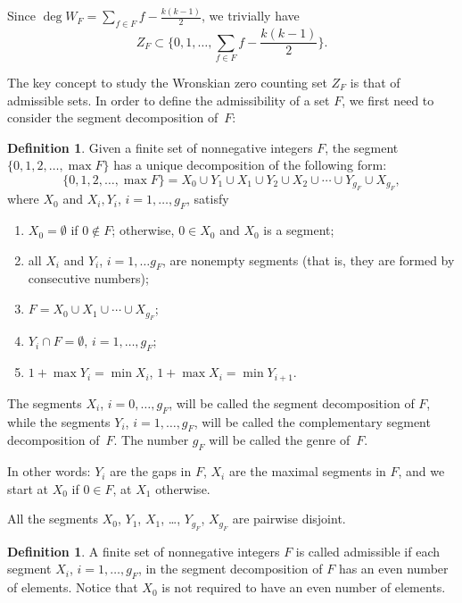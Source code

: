 \documentclass[10pt]{article}
\theoremstyle{plain}
\theoremstyle{definition}
\newtheorem{definition}[theorem]{Definition}
\numberwithin{equation}{section} %
\begin{document}
Since $\deg W_F=\sum_{f\in F}f-\frac{k(k-1)}{2}$, we trivially have
\[
  Z_F\subset \bigg\{0,1,\dots, \sum_{f\in F}f-\frac{k(k-1)}{2}\bigg\}.
\]

The key concept to study the Wronskian zero counting set $Z_F$ is that of admissible sets. In order to define the admissibility of a set $F$, we first need to consider the segment decomposition of~$F$:

\begin{definition}
Given a finite set of nonnegative integers $F$, the segment $\{0,1,\allowbreak 2,\dots,\allowbreak \max F\}$ has a unique decomposition of the following form:
\[
   \{0,1,2,\dots,\max F\}
   = X_0 \cup Y_1 \cup X_1 \cup Y_2 \cup X_2 \cup
   \dotsb \cup Y_{g_F} \cup X_{g_F},
\]
where $X_0$ and $X_i, Y_i$, $i=1,\dots, g_F$, satisfy
\begin{enumerate}
\item $X_0 = \emptyset$ if $0 \notin F$; otherwise, $0 \in X_0$ and $X_0$ is a segment;
\item all $X_i$ and $Y_i$, $i = 1, \dots g_F$, are nonempty segments (that is, they are formed by consecutive numbers);
\item $F = X_0 \cup X_1 \cup \dotsb \cup X_{g_F}$;
\item $Y_i\cap F=\emptyset$, $i=1,\dots,g_F$;
\item $1+\max Y_i=\min X_i$, $1+\max X_i=\min Y_{i+1}$.
\end{enumerate}
The segments $X_i$, $i=0,\dots,g_F$, will be called the segment decomposition of $F$, while the segments $Y_i$, $i=1,\dots,g_F$,
will be called the complementary segment decomposition of~$F$. The number $g_F$ will be called the genre of~$F$.

In other words: $Y_i$ are the gaps in $F$, $X_i$ are the maximal segments in $F$, and we start at $X_0$ if $0 \in F$, at $X_1$ otherwise.
\end{definition}

All the segments $X_0$, $Y_1$, $X_1$, \dots, $Y_{g_F}$, $X_{g_F}$ are pairwise disjoint.

\begin{definition}
A finite set of nonnegative integers $F$ is called admissible if  each segment $X_i$, $i=1,\dots, g_F$, in the segment decomposition of $F$ has an even number of elements. Notice that $X_0$ is not required to have an even number of elements.
\end{definition}
\end{document}
